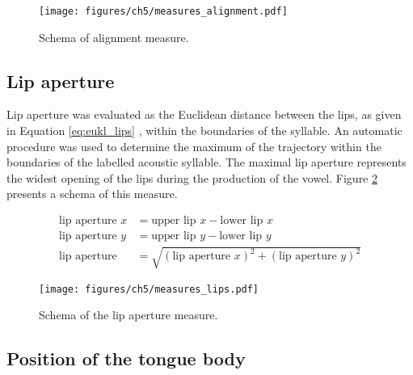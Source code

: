 \begin{figure}
\texttt{[image: figures/ch5/measures\_alignment.pdf]}
\caption{Schema of alignment measure.}
\label{fig:alignment_measure}
\end{figure}

\subsection{Lip aperture}

Lip aperture was evaluated as the Euclidean distance between the lips, as given in Equation \ref{eq:eukl_lips} \citep{Byrd2000}, within the boundaries of the syllable. An automatic procedure was used to determine the maximum of the trajectory within the boundaries of the labelled acoustic syllable. The maximal lip aperture represents the widest opening of the lips during the production of the vowel. Figure \ref{fig:lip_measure} presents a schema of this measure.

\begin{equation}
\begin{split}
\text{lip aperture } x &= \text{upper lip } x - \text{lower lip } x\\
\text{lip aperture } y &= \text{upper lip } y - \text{lower lip } y\\
\text{lip aperture} &= \sqrt{(\text{lip aperture } x)^2+(\text{lip aperture } y)^2}
\end{split}
\label{eq:eukl_lips}
\end{equation}

\begin{figure}
\texttt{[image: figures/ch5/measures\_lips.pdf]}
\caption{Schema of the lip aperture measure.}
\label{fig:lip_measure}
\end{figure}

\subsection{Position of the tongue body}

